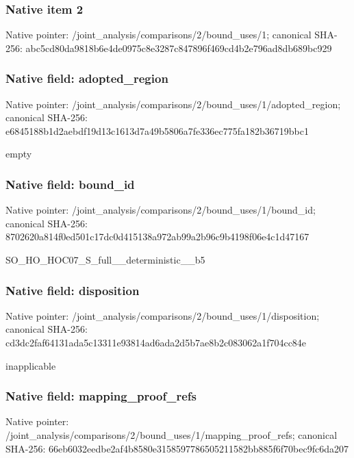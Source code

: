 \documentclass[10pt,a4paper]{article}
\begin{document}
\subsubsection{Native item 2}
Native pointer: /joint\_\allowbreak{}analysis/comparisons/2/bound\_\allowbreak{}uses/1; canonical SHA-256: abc5cd80da9818b6e4de0975c8e3287c847896f469cd4b2e796ad8db689bc929

\subsubsection{Native field: adopted\_\allowbreak{}region}
Native pointer: /joint\_\allowbreak{}analysis/comparisons/2/bound\_\allowbreak{}uses/1/adopted\_\allowbreak{}region; canonical SHA-256: e6845188b1d2aebdf19d13c1613d7a49b5806a7fe336ec775fa182b36719bbc1

\begingroup\raggedright\sloppy empty\par\endgroup

\subsubsection{Native field: bound\_\allowbreak{}id}
Native pointer: /joint\_\allowbreak{}analysis/comparisons/2/bound\_\allowbreak{}uses/1/bound\_\allowbreak{}id; canonical SHA-256: 8702620a814f0ed501c17dc0d415138a972ab99a2b96c9b4198f06e4c1d47167

\begingroup\raggedright\sloppy SO\_\allowbreak{}HO\_\allowbreak{}HOC07\_\allowbreak{}S\_\allowbreak{}full\_\allowbreak{}\_\allowbreak{}deterministic\_\allowbreak{}\_\allowbreak{}b5\par\endgroup

\subsubsection{Native field: disposition}
Native pointer: /joint\_\allowbreak{}analysis/comparisons/2/bound\_\allowbreak{}uses/1/disposition; canonical SHA-256: cd3dc2faf64131ada5c13311e93814ad6ada2d5b7ae8b2c083062a1f704cc84e

\begingroup\raggedright\sloppy inapplicable\par\endgroup

\subsubsection{Native field: mapping\_\allowbreak{}proof\_\allowbreak{}refs}
Native pointer: /joint\_\allowbreak{}analysis/comparisons/2/bound\_\allowbreak{}uses/1/mapping\_\allowbreak{}proof\_\allowbreak{}refs; canonical SHA-256: 66eb6032eedbe2af4b8580e3158597786505211582bb885f6f70bec9fc6da207
\end{document}
